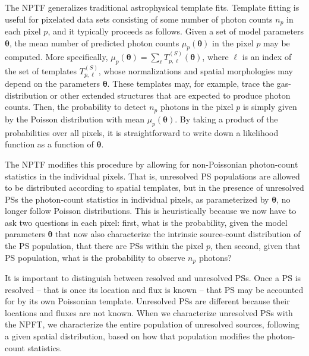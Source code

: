 The NPTF generalizes traditional astrophysical template fits.  Template fitting is useful for pixelated data sets consisting of some number of photon counts $n_p$ in each pixel $p$, and it typically proceeds as follows.   Given a set of model parameters $\bm{\theta}$, the mean number of predicted photon counts $\mu_p({\bm{\theta}})$ in the pixel $p$ may be computed.  More specifically, $\mu_p({\bm{\theta}}) = \sum_{\ell} T^{(S)}_{p,\ell}({\bm{\theta}})$, where $\ell$ is an index of the set of templates $T^{(S)}_{p, \ell}$, whose normalizations and spatial morphologies may depend on the parameters $\bm{\theta}$. These templates may, for example, trace the gas-distribution or other extended structures that are expected to produce photon counts.  Then, the probability to detect $n_p$ photons in the pixel $p$ is simply given by the Poisson distribution with mean $\mu_p({\bm{\theta}})$.  By taking a product of the probabilities over all pixels, it is straightforward to write down a likelihood function as a function of ${\bm{\theta}}$.  

The NPTF modifies this procedure by allowing for non-Poissonian photon-count statistics in the individual pixels.  That is, unresolved PS populations are allowed to be distributed according to spatial templates, but in the presence of unresolved PSs the photon-count statistics in individual pixels, as parameterized by ${\bm{\theta}}$, no longer follow Poisson distributions.  This is heuristically because we now have to ask two questions in each pixel: first, what is the probability, given the model parameters ${\bm{\theta}}$ that now also characterize the intrinsic source-count distribution of the PS population, that there are PSs within the pixel $p$, then second, given that PS population, what is the probability to observe $n_p$ photons?

It is important to distinguish between resolved and unresolved PSs.  Once a PS is resolved -- that is once its location and flux is known -- that PS may be accounted for by its own Poissonian template.  Unresolved PSs are different because their locations and fluxes are not known.  When we characterize unresolved PSs with the NPFT, we characterize the entire population of unresolved sources, following a given spatial distribution, based on how that population modifies the photon-count statistics.
  
